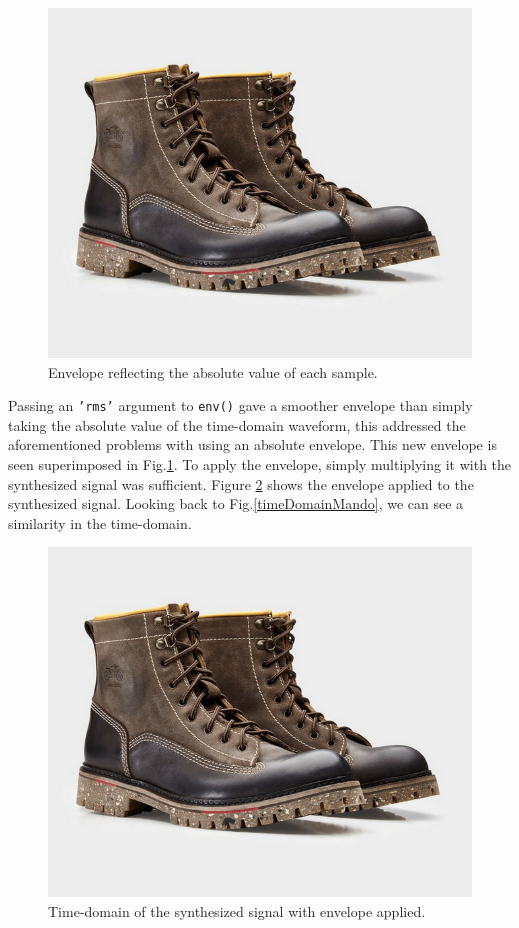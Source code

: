\documentclass{article}
\begin{document}
        \begin{figure}[h]
            \includegraphics[scale=0.25]{images/placeholder.png}%
            \centering
            \caption{Envelope reflecting the absolute value of each sample.}
            \label{env}
        \end{figure}
        Passing an \texttt{'rms'} argument to \texttt{env()} gave a smoother envelope than simply taking the absolute value of the time-domain waveform, this addressed the aforementioned problems with using an absolute envelope.
        This new envelope is seen superimposed in Fig.\ref{env}.
        To apply the envelope, simply multiplying it with the synthesized signal was sufficient.
        Figure \ref{additiveEnv} shows the envelope applied to the synthesized signal.
        Looking back to Fig.\ref{timeDomainMando}, we can see a similarity in the time-domain.
        \begin{figure}[h]
            \includegraphics[scale=0.25]{images/placeholder.png}%
            \centering
            \caption{Time-domain of the synthesized signal with envelope applied.}
            \label{additiveEnv}
        \end{figure}
\end{document}
